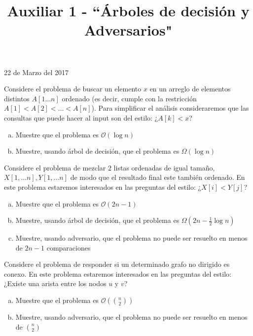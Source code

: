 \documentclass[dcc,uchile]{fcfmcourse}
\title{Auxiliar 1 - ``Árboles de decisión y Adversarios"}
\theoremstyle{plain}
\theoremstyle{definition}
\begin{document}
\maketitle
\begin{center}
22 de Marzo del 2017
\end{center}
\vspace{-1ex}


\begin{problems}


Considere el problema de buscar un elemento $x$ en un arreglo de elementos distintos $A[1\ldots n]$ ordenado (es decir, cumple con la restricción $A[1] < A[2] < \ldots < A[n]$). Para simplificar el análisis consideraremos que las consultas que puede hacer al input son del estilo: ¿$A[k]<x$?
\begin{enumerate}[a)]
    \item Muestre que el problema es $\mathcal{O}(\log n)$
    \item Muestre, usando árbol de decisión, que el problema es $\Omega (\log n)$
\end{enumerate}

Considere el problema de mezclar 2 listas ordenadas de igual tamaño, $X[1,\ldots n], Y[1,\ldots n]$ de modo que el resultado final este también ordenado. En este problema estaremos interesados en las preguntas del estilo: ¿$X[i]<Y[j]$?
\begin{enumerate}[a)]
    \item Muestre que el problema es $\mathcal{O}(2n-1)$
    \item Muestre, usando árbol de decisión, que el problema es $\Omega \left(2n-\frac{1}{2}\log n\right)$
    \item Muestre, usando adversario, que el problema no puede ser resuelto en menos de $2n-1$ comparaciones
\end{enumerate}

Considere el problema de responder si un determinado grafo no dirigido es conexo. En este problema estaremos interesados en las preguntas del estilo: ¿Existe una arista entre los nodos $u$ y $v$?
\begin{enumerate}[a)]
    \item Muestre que el problema es $\mathcal{O}(\binom{n}{2})$
    \item Muestre, usando adversario, que el problema no puede ser resuelto en menos de $\binom{n}{2}$
\end{enumerate}
\end{problems}
\end{document}
